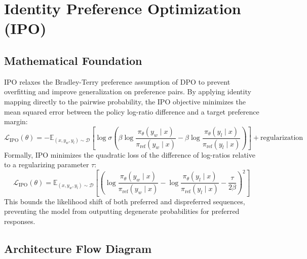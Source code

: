\newpage
\section{Identity Preference Optimization (IPO)}

\subsection{Mathematical Foundation}
IPO relaxes the Bradley-Terry preference assumption of DPO to prevent overfitting and improve generalization on preference pairs. By applying identity mapping directly to the pairwise probability, the IPO objective minimizes the mean squared error between the policy log-ratio difference and a target preference margin:
\begin{equation}
  \mathcal{L}_{\text{IPO}}(\theta) = -\mathbb{E}_{(x, y_w, y_l) \sim \mathcal{D}} \left[ \log \sigma \left( \beta \log \frac{\pi_\theta(y_w \mid x)}{\pi_{\text{ref}}(y_w \mid x)} - \beta \log \frac{\pi_\theta(y_l \mid x)}{\pi_{\text{ref}}(y_l \mid x)} \right) \right] + \text{regularization}
\end{equation}
Formally, IPO minimizes the quadratic loss of the difference of log-ratios relative to a regularizing parameter $\tau$:
\begin{equation}
  \mathcal{L}_{\text{IPO}}(\theta) = \mathbb{E}_{(x, y_w, y_l) \sim \mathcal{D}} \left[ \left( \log \frac{\pi_\theta(y_w \mid x)}{\pi_{\text{ref}}(y_w \mid x)} - \log \frac{\pi_\theta(y_l \mid x)}{\pi_{\text{ref}}(y_l \mid x)} - \frac{\tau}{2 \beta} \right)^2 \right]
\end{equation}
This bounds the likelihood shift of both preferred and dispreferred sequences, preventing the model from outputting degenerate probabilities for preferred responses.

\subsection{Architecture Flow Diagram}

